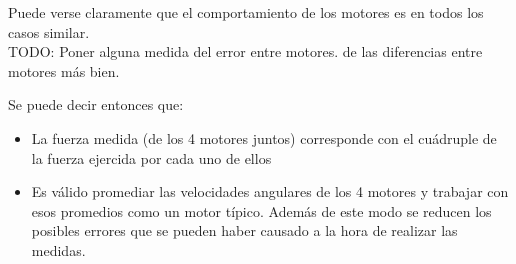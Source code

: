 \documentclass[spanish,12pt,a4paper,titlepage]{report}
\begin{document}
Puede verse claramente que el comportamiento de los motores es en todos los casos similar.\\

TODO: Poner alguna medida del error entre motores. de las diferencias entre motores más bien.

Se puede decir entonces que:
\begin{itemize}
\item La fuerza medida (de los 4 motores juntos) corresponde con el cuádruple de la fuerza ejercida por cada uno de ellos
\item Es válido promediar las velocidades angulares de los 4 motores y trabajar con esos promedios como un motor típico. Además de este modo se reducen los posibles errores que se pueden haber causado a la hora de realizar las medidas.
\end{itemize}
\end{document}
